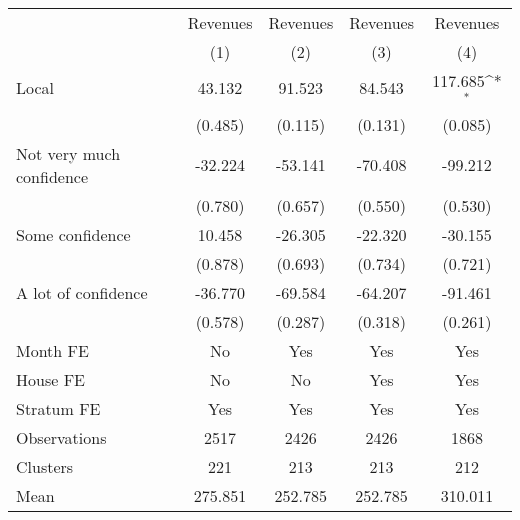 {
\def\sym#1{\ifmmode^{#1}\else\(^{#1}\)\fi}
\begin{tabular}{l*{4}{c}}
\toprule
                &\multicolumn{1}{c}{Revenues}&\multicolumn{1}{c}{Revenues}&\multicolumn{1}{c}{Revenues}&\multicolumn{1}{c}{Revenues}\\
                &\multicolumn{1}{c}{(1)}         &\multicolumn{1}{c}{(2)}         &\multicolumn{1}{c}{(3)}         &\multicolumn{1}{c}{(4)}         \\
\midrule
Local           &   43.132         &   91.523         &   84.543         &  117.685\sym{*}  \\
                &  (0.485)         &  (0.115)         &  (0.131)         &  (0.085)         \\
Not very much confidence&  -32.224         &  -53.141         &  -70.408         &  -99.212         \\
                &  (0.780)         &  (0.657)         &  (0.550)         &  (0.530)         \\
Some confidence &   10.458         &  -26.305         &  -22.320         &  -30.155         \\
                &  (0.878)         &  (0.693)         &  (0.734)         &  (0.721)         \\
A lot of confidence&  -36.770         &  -69.584         &  -64.207         &  -91.461         \\
                &  (0.578)         &  (0.287)         &  (0.318)         &  (0.261)         \\
Month FE        &       No         &      Yes         &      Yes         &      Yes         \\
House FE        &       No         &       No         &      Yes         &      Yes         \\
Stratum FE      &      Yes         &      Yes         &      Yes         &      Yes         \\
\midrule
Observations    &     2517         &     2426         &     2426         &     1868         \\
Clusters        &      221         &      213         &      213         &      212         \\
Mean            &  275.851         &  252.785         &  252.785         &  310.011         \\
\bottomrule
\end{tabular}
}
